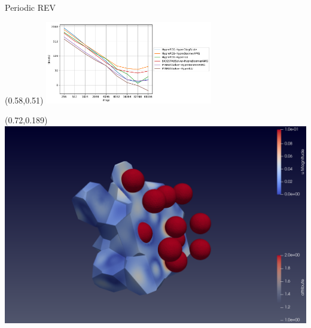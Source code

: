\documentclass{beamer}
\begin{document}
\begin{frame}{Periodic
    REV\\\hspace*{1cm}{\small Large runs on 65k cores}}
\begin{textblock}{.48}
\hspace*{3mm}
\end{textblock}
\begin{textblock}{.48}(0.58,0.51)
\includegraphics[trim = .1cm .1cm 7.9cm .1cm,clip,height=3.6cm]{ver/timer-r3.pdf}\\[-3mm]
\hspace*{-.5mm}
\end{textblock}
\begin{textblock}{.38}(0.72,0.189)
\includegraphics[trim = 2.9cm .1cm 1.cm .1cm,clip,width=3.cm]{ver/vue2.png}\\[-1mm]
\hspace*{3mm}
\end{textblock}
\end{frame}
\end{document}
